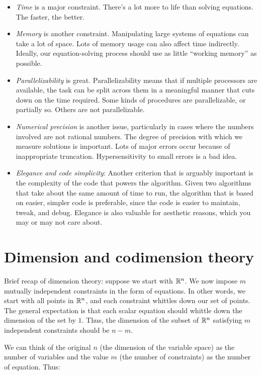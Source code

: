 \documentclass[10pt]{amsart}
\begin{document}
\begin{itemize}
\item {\em Time} is a major constraint. There's a lot more to life
  than solving equations. The faster, the better.
\item {\em Memory} is another constraint. Manipulating large systems
  of equations can take a lot of space. Lots of memory usage can also
  affect time indirectly. Ideally, our equation-solving process should
  use as little ``working memory'' as possible.
\item {\em Parallelizability} is great. Parallelizability means that
  if multiple processors are available, the task can be split across
  them in a meaningful manner that cuts down on the time
  required. Some kinds of procedures are parallelizable, or partially
  so. Others are not parallelizable.
\item {\em Numerical precision} is another issue, particularly in
  cases where the numbers involved are not rational numbers. The
  degree of precision with which we measure solutions is
  important. Lots of major errors occur because of inappropriate
  truncation. Hypersensitivity to small errors is a bad idea.
\item {\em Elegance and code simplicity}: Another criterion that is
  arguably important is the complexity of the code that powers the
  algorithm. Given two algorithms that take about the same amount of
  time to run, the algorithm that is based on easier, simpler code is
  preferable, since the code is easier to maintain, tweak, and
  debug. Elegance is also valuable for aesthetic reasons, which you
  may or may not care about.
\end{itemize}

\section{Dimension and codimension theory}

Brief recap of dimension theory: suppose we start with $\mathbb{R}^n$. We now
impose $m$ mutually independent constraints in the form of
equations. In other words, we start with all points in $\mathbb{R}^n$, and
each constraint whittles down our set of points. The general
expectation is that each scalar equation should whittle down the
dimension of the set by $1$. Thus, the dimension of the subset of
$\mathbb{R}^n$ satisfying $m$ independent constraints should be $n - m$. 

We can think of the original $n$ (the dimension of the variable space)
as the number of variables and the value $m$ (the number of
constraints) as the number of equation. Thus:
\end{document}
